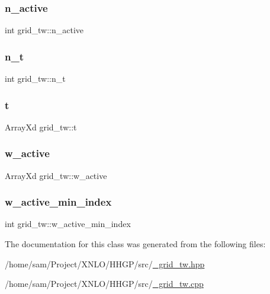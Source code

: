 \subsubsection{\texorpdfstring{n\+\_\+active}{n\_active}}
{\footnotesize\ttfamily int grid\+\_\+tw\+::n\+\_\+active}

\mbox{\label{classgrid__tw_ac121ce740479f628bdaa54627540ad42}} 
\subsubsection{\texorpdfstring{n\+\_\+t}{n\_t}}
{\footnotesize\ttfamily int grid\+\_\+tw\+::n\+\_\+t}

\mbox{\label{classgrid__tw_a918f1e6d18056d0f6da08fe01089b9b0}} 
\subsubsection{\texorpdfstring{t}{t}}
{\footnotesize\ttfamily Array\+Xd grid\+\_\+tw\+::t}

\mbox{\label{classgrid__tw_a66922766c9dfe5c4667e55e678b134b9}} 
\subsubsection{\texorpdfstring{w\+\_\+active}{w\_active}}
{\footnotesize\ttfamily Array\+Xd grid\+\_\+tw\+::w\+\_\+active}

\mbox{\label{classgrid__tw_a27d987fb3c8cbacf9cd152b83477f0d9}} 
\subsubsection{\texorpdfstring{w\+\_\+active\+\_\+min\+\_\+index}{w\_active\_min\_index}}
{\footnotesize\ttfamily int grid\+\_\+tw\+::w\+\_\+active\+\_\+min\+\_\+index}



The documentation for this class was generated from the following files\+:\begin{DoxyCompactItemize}
\item 
/home/sam/\+Project/\+X\+N\+L\+O/\+H\+H\+G\+P/src/\hyperlink{__grid__tw_8hpp}{\+\_\+grid\+\_\+tw.\+hpp}\item 
/home/sam/\+Project/\+X\+N\+L\+O/\+H\+H\+G\+P/src/\hyperlink{__grid__tw_8cpp}{\+\_\+grid\+\_\+tw.\+cpp}\end{DoxyCompactItemize}
